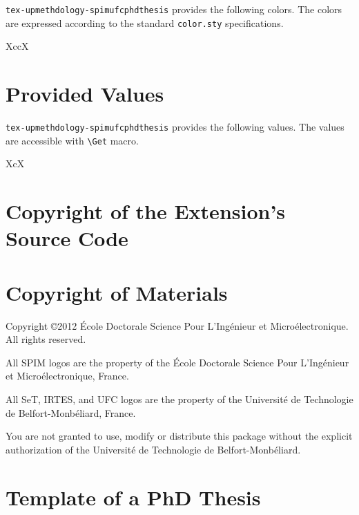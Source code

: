 \documentclass[article,english]{upmethodology-document}
\gdef\upmextensiondoccolorlist{}
\gdef\upmextensiondocvaluelist{}
\begin{document}
\texttt{tex-upmethdology-spimufcphdthesis} provides the following colors. The colors are expressed according to the standard \texttt{color.sty} specifications.

\begin{mtabular}{4}{XccX}
\upmextensiondoccolorlist
\end{mtabular}

\section{Provided Values}

\texttt{tex-upmethdology-spimufcphdthesis} provides the following values. The values are accessible with \texttt{{\textbackslash}Get} macro.

\begin{mtabular}{3}{XcX}
\end{mtabular}

\section{Copyright of the Extension's Source Code}



\section{Copyright of Materials}

Copyright \copyright 2012 \'Ecole Doctorale Science Pour L'Ing\'enieur et Micro\'electronique. All rights reserved.

All SPIM logos are the property of the \'Ecole Doctorale Science Pour L'Ing\'enieur et Micro\'electronique, France.

All SeT, IRTES, and UFC logos are the property of the Universit\'e de Technologie de Belfort-Monb\'eliard, France.

You are not granted to use, modify or distribute this package without the explicit authorization of the Universit\'e de Technologie de Belfort-Monb\'eliard.

\section{Template of a PhD Thesis}
\end{document}
